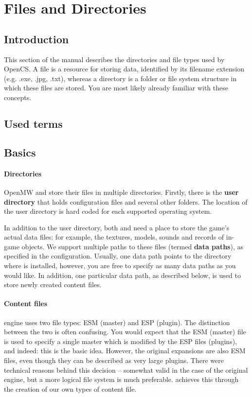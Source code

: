 \section{Files and Directories}
\subsection{Introduction}
This section of the manual describes the directories and file types used by OpenCS. A file is a resource for storing data, identified by its
filename extension (e.g. .exe, .jpg, .txt), whereas a directory is a folder or file system structure in which these files are stored. You
are most likely already familiar with these concepts.

\subsection{Used terms} %

\subsection{Basics}

\paragraph{Directories}
OpenMW and \OCS{} store their files in multiple directories. Firstly, there is the \textbf{user directory} that holds configuration
files and several other folders. The location of the user directory is hard coded for each supported operating system.

In addition to the user directory, both \OMW{} and \OCS{} need a place to store the game’s actual data files: for example, the
textures, models, sounds and records of in-game objects. We support multiple paths to these files (termed \textbf{data paths}),
as specified in the configuration. Usually, one data path points to the directory where \MW{} is installed, however, you are
free to specify as many data paths as you would like. In addition, one particular data path, as described below, is used to store
newly created content files.

\paragraph{Content files}
\BS{} \MW{} engine uses two file types: ESM (master) and ESP (plugin). The distinction between the two is often confusing.
You would expect that the ESM (master) file is used to specify a single master which is modified by the ESP files (plugins), and indeed:
this is the basic idea. However, the original expansions are also ESM files, even though they can be described as very large plugins.
There were technical reasons behind this decision -- somewhat valid in the case of the original engine, but a more logical file system is
much preferable. \OMW{} achieves this through the creation of our own types of content file.


